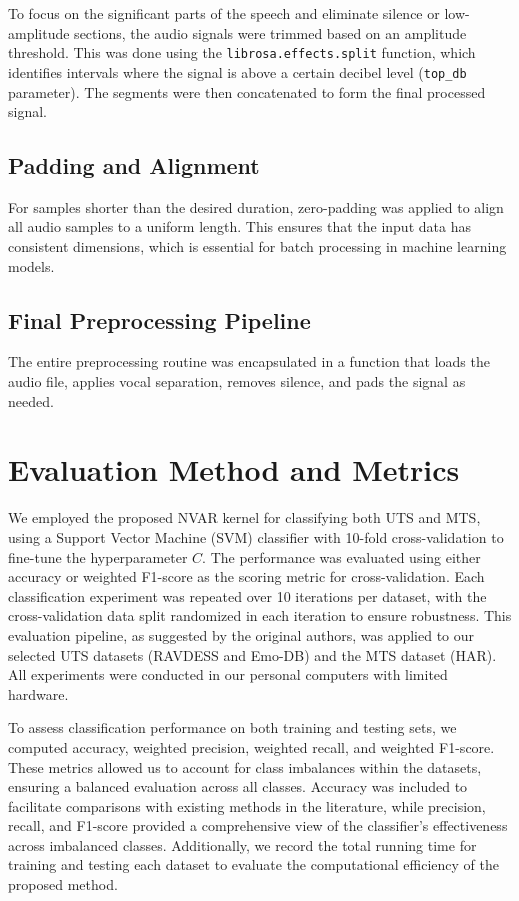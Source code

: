 To focus on the significant parts of the speech and eliminate silence or low-ampli\-tude sections, the audio signals were trimmed based on an amplitude threshold. This was done using the \texttt{librosa.effects.split} function, which identifies intervals where the signal is above a certain decibel level (\texttt{top\_db} parameter). The segments were then concatenated to form the final processed signal.

\subsection{Padding and Alignment}

For samples shorter than the desired duration, zero-padding was applied to align all audio samples to a uniform length. This ensures that the input data has consistent dimensions, which is essential for batch processing in machine learning models.

\subsection{Final Preprocessing Pipeline}

The entire preprocessing routine was encapsulated in a function that loads the audio file, applies vocal separation, removes silence, and pads the signal as needed.

\section{Evaluation Method and Metrics}

We employed the proposed NVAR kernel for classifying both UTS and MTS, using a Support Vector Machine (SVM) classifier with 10-fold cross-validation to fine-tune the hyperparameter $C$. The performance was evaluated using either accuracy or weighted F1-score as the scoring metric for cross-validation. Each classification experiment was repeated over 10 iterations per dataset, with the cross-validation data split randomized in each iteration to ensure robustness. This evaluation pipeline, as suggested by the original authors, was applied to our selected UTS datasets (RAVDESS and Emo-DB) and the MTS dataset (HAR). All experiments were conducted in our personal computers with limited hardware. 

To assess classification performance on both training and testing sets, we computed accuracy, weighted precision, weighted recall, and weighted F1-score. These metrics allowed us to account for class imbalances within the datasets, ensuring a balanced evaluation across all classes. Accuracy was included to facilitate comparisons with existing methods in the literature, while precision, recall, and F1-score provided a comprehensive view of the classifier’s effectiveness across imbalanced classes. Additionally, we record the total running time for training and testing each dataset to evaluate the computational efficiency of the proposed method.

